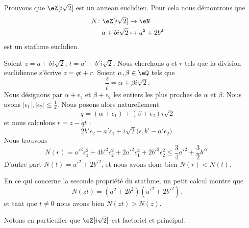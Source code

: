 

\begin{example} \label{ExeDufyZI}
	Prouvons que \( \eZ[i\sqrt{2}]\) est un anneau euclidien. Pour cela nous démontrons que
	\begin{equation}    \label{EqOZUIooZGmHWl}
		\begin{aligned}
			N\colon \eZ[i\sqrt{2}] & \to \eN          \\
			a+bi\sqrt{2}           & \mapsto a^2+2b^2
		\end{aligned}
	\end{equation}
	est un stathme euclidien.

	Soient \( z=a+bi\sqrt{2}\), \( t=a'+b'i\sqrt{2}\). Nous cherchons \( q\) et \( r\) tels que la division euclidienne s'écrive \( z=qt+r\). Soient \( \alpha,\beta\in \eQ\) tels que
	\begin{equation}
		\frac{ z }{ t }=\alpha+\beta i\sqrt{2}.
	\end{equation}
	Nous désignons par \( \alpha+\epsilon_1\) et \( \beta+\epsilon_2\) les entiers les plus proches de \( \alpha\) et \( \beta\). Nous avons \( | \epsilon_1 |,| \epsilon_2 |\leq \frac{ 1 }{2}\). Nous posons alors naturellement
	\begin{equation}
		q=(\alpha+\epsilon_1)+(\beta+\epsilon_2)i\sqrt{2}
	\end{equation}
	et nous calculons \( r=z-qt\) :
	\begin{equation}
		2b'\epsilon_2-a'\epsilon_1+i\sqrt{2}\big( \epsilon_1b'-a'\epsilon_2 \big).
	\end{equation}
	Nous trouvons
	\begin{equation}
		N(r)=a'^2\epsilon_1^2+4b'^2\epsilon_2^2+2a'^2\epsilon_1^2+2b'^2\epsilon_2^2\leq \frac{ 3 }{ 4 }a'^2+\frac{ 3 }{2}b'^2.
	\end{equation}
	D'autre part \( N(t)=a'^2+2b'^2\), et nous avons donc bien \( N(r)<N(t)\).

	En ce qui concerne la seconde propriété du stathme, un petit calcul montre que
	\begin{equation}
		N(zt)=(a^2+2b^2)(a'^2+2b'^2),
	\end{equation}
	et tant que \( t\neq 0\) nous avons bien \( N(zt)>N(z)\).
\end{example}

Notons en particulier que \( \eZ[i\sqrt{2}]\) est factoriel et principal.


